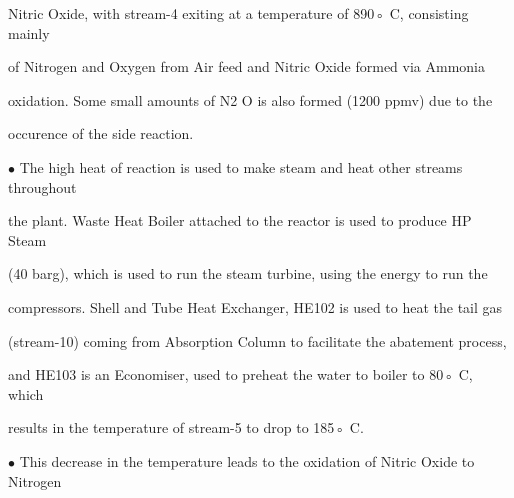 \documentclass[a4paper,portrait,12pt]{article}
\begin{document}
\begin{flushleft}
Nitric Oxide, with stream-4 exiting at a temperature of 890◦ C, consisting mainly
\end{flushleft}


\begin{flushleft}
of Nitrogen and Oxygen from Air feed and Nitric Oxide formed via Ammonia
\end{flushleft}


\begin{flushleft}
oxidation. Some small amounts of N2 O is also formed (1200 ppmv) due to the
\end{flushleft}


\begin{flushleft}
occurence of the side reaction.
\end{flushleft}


\begin{flushleft}
$\bullet$ The high heat of reaction is used to make steam and heat other streams throughout
\end{flushleft}


\begin{flushleft}
the plant. Waste Heat Boiler attached to the reactor is used to produce HP Steam
\end{flushleft}


\begin{flushleft}
(40 barg), which is used to run the steam turbine, using the energy to run the
\end{flushleft}


\begin{flushleft}
compressors. Shell and Tube Heat Exchanger, HE102 is used to heat the tail gas
\end{flushleft}


\begin{flushleft}
(stream-10) coming from Absorption Column to facilitate the abatement process,
\end{flushleft}


\begin{flushleft}
and HE103 is an Economiser, used to preheat the water to boiler to 80◦ C, which
\end{flushleft}


\begin{flushleft}
results in the temperature of stream-5 to drop to 185◦ C.
\end{flushleft}


\begin{flushleft}
$\bullet$ This decrease in the temperature leads to the oxidation of Nitric Oxide to Nitrogen
\end{flushleft}
\end{document}

